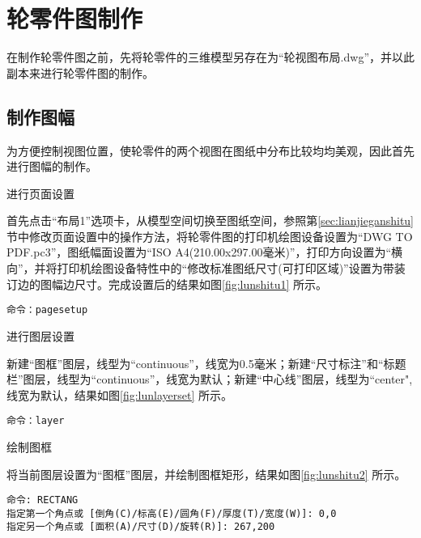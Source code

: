 \section{轮零件图制作}
在制作轮零件图之前，先将轮零件的三维模型另存在为“轮视图布局.dwg”，并以此副本来进行轮零件图的制作。
\subsection{制作图幅}
为方便控制视图位置，使轮零件的两个视图在图纸中分布比较均均美观，因此首先进行图幅的制作。
\begin{procedure}
\item 进行页面设置

首先点击“布局1”选项卡，从模型空间切换至图纸空间，参照第\ref{sec:lianjieganshitu}节中修改页面设置中的操作方法，将轮零件图的打印机绘图设备设置为“DWG TO PDF.pc3”，图纸幅面设置为“ISO A4(210.00x297.00毫米)”，打印方向设置为“横向”，并将打印机绘图设备特性中的“修改标准图纸尺寸(可打印区域)”设置为带装订边的图幅边尺寸。完成设置后的结果如图\ref{fig:lunshitu1} 所示。
\begin{lstlisting}
命令：pagesetup
\end{lstlisting}
\item 进行图层设置

新建“图框”图层，线型为“continuous”，线宽为0.5毫米；新建“尺寸标注”和“标题栏”图层，线型为“continuous”，线宽为默认；新建“中心线”图层，线型为“center",线宽为默认，结果如图\ref{fig:lunlayerset} 所示。
\begin{lstlisting}
命令：layer
\end{lstlisting}
\begin{figure}[htbp]
\centering
\begin{floatrow}[3]
\end{floatrow}
\end{figure}
\item 绘制图框

将当前图层设置为“图框”图层，并绘制图框矩形，结果如图\ref{fig:lunshitu2} 所示。
\begin{lstlisting}
命令: RECTANG
指定第一个角点或 [倒角(C)/标高(E)/圆角(F)/厚度(T)/宽度(W)]: 0,0
指定另一个角点或 [面积(A)/尺寸(D)/旋转(R)]: 267,200
\end{lstlisting}


\end{procedure}
